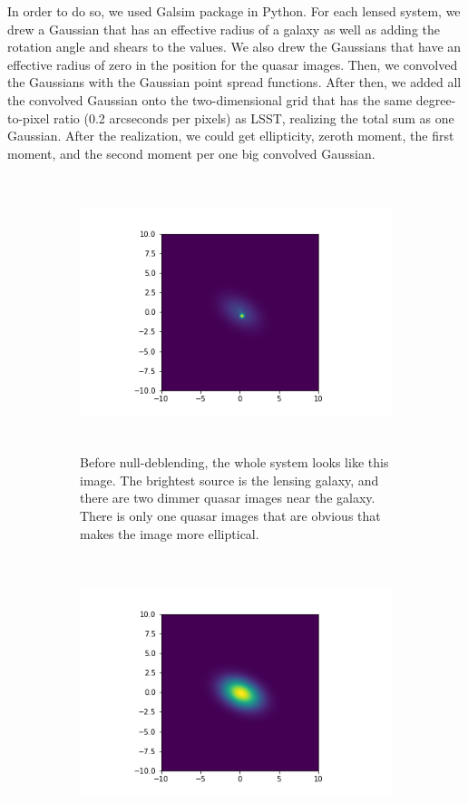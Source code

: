 \documentclass[\docopts]{\docclass}
\begin{document}
In order to do so, we used Galsim package in Python. For each lensed system, we drew a Gaussian that has an effective radius of a galaxy as well as adding the rotation angle and shears to the values. We also drew the Gaussians that have an effective radius of zero in the position for the quasar images. Then, we convolved the Gaussians with the Gaussian point spread functions. After then, we added all the convolved Gaussian onto the two-dimensional grid that has the same degree-to-pixel ratio (0.2 arcseconds per pixels) as LSST, realizing the total sum as one Gaussian. After the realization, we could get ellipticity, zeroth moment, the first moment, and the second moment per one big convolved Gaussian.
\begin{figure}
    \centering
    \begin{subfigure}[bt]{0.48\linewidth}        %
        \centering
        \includegraphics[width=\linewidth, height=8cm]{beforenulldeblend.png}
        \caption{Before null-deblending, the whole system looks like this image. The brightest source is the lensing galaxy, and there are two dimmer quasar images near the galaxy. There is only one quasar images that are obvious that makes the image more elliptical.}
    \end{subfigure}
    \begin{subfigure}[bt]{0.48\linewidth}        %
        \centering
        \includegraphics[width=\linewidth, height=8cm]{afternulldeblend.png}

\end{subfigure}
\end{figure}
\end{document}
